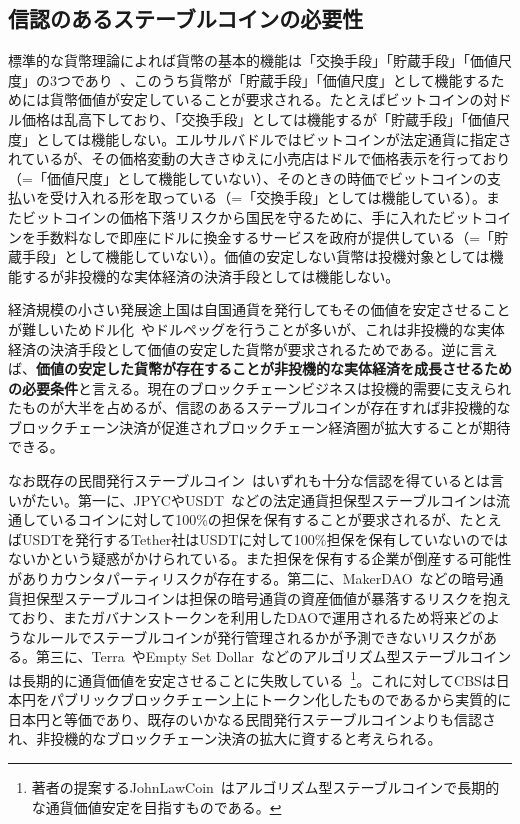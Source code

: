 \documentclass[dvipdfmx,a4paper]{jsarticle}
\begin{document}
\subsection{信認のあるステーブルコインの必要性}

標準的な貨幣理論によれば貨幣の基本的機能は「交換手段」「貯蔵手段」「価値尺度」の3つであり~\cite{davies2010history}、このうち貨幣が「貯蔵手段」「価値尺度」として機能するためには貨幣価値が安定していることが要求される。たとえばビットコインの対ドル価格は乱高下しており、「交換手段」としては機能するが「貯蔵手段」「価値尺度」としては機能しない。エルサルバドルではビットコインが法定通貨に指定されているが、その価格変動の大きさゆえに小売店はドルで価格表示を行っており（=「価値尺度」として機能していない）、そのときの時価でビットコインの支払いを受け入れる形を取っている（=「交換手段」としては機能している）。またビットコインの価格下落リスクから国民を守るために、手に入れたビットコインを手数料なしで即座にドルに換金するサービスを政府が提供している（=「貯蔵手段」として機能していない）。価値の安定しない貨幣は投機対象としては機能するが非投機的な実体経済の決済手段としては機能しない。

経済規模の小さい発展途上国は自国通貨を発行してもその価値を安定させることが難しいためドル化~\cite{calvo2002dollarization,selgin2005currency}やドルペッグを行うことが多いが、これは非投機的な実体経済の決済手段として価値の安定した貨幣が要求されるためである。逆に言えば、\textbf{価値の安定した貨幣が存在することが非投機的な実体経済を成長させるための必要条件}と言える。現在のブロックチェーンビジネスは投機的需要に支えられたものが大半を占めるが、信認のあるステーブルコインが存在すれば非投機的なブロックチェーン決済が促進されブロックチェーン経済圏が拡大することが期待できる。

なお既存の民間発行ステーブルコイン~\cite{arner2020stablecoins,moin2020sok}はいずれも十分な信認を得ているとは言いがたい。第一に、JPYCやUSDT~\cite{tether}などの法定通貨担保型ステーブルコインは流通しているコインに対して100\%の担保を保有することが要求されるが、たとえばUSDTを発行するTether社はUSDTに対して100\%担保を保有していないのではないかという疑惑がかけられている。また担保を保有する企業が倒産する可能性がありカウンタパーティリスクが存在する。第二に、MakerDAO~\cite{makerdao}などの暗号通貨担保型ステーブルコインは担保の暗号通貨の資産価値が暴落するリスクを抱えており、またガバナンストークンを利用したDAOで運用されるため将来どのようなルールでステーブルコインが発行管理されるかが予測できないリスクがある。第三に、Terra~\cite{terra}やEmpty Set Dollar~\cite{emptysetdollar}などのアルゴリズム型ステーブルコインは長期的に通貨価値を安定させることに失敗している~\footnote{著者の提案するJohnLawCoin~\cite{johnlawcoin}はアルゴリズム型ステーブルコインで長期的な通貨価値安定を目指すものである。}。これに対してCBSは日本円をパブリックブロックチェーン上にトークン化したものであるから実質的に日本円と等価であり、既存のいかなる民間発行ステーブルコインよりも信認され、非投機的なブロックチェーン決済の拡大に資すると考えられる。
\end{document}
